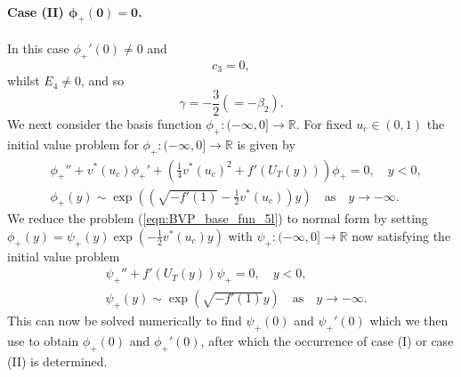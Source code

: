 \documentclass[11pt,a4paper]{article}
\newcommand{\eeref}[1]{(\ref{eqn:#1})}
\newcommand{\eelab}[1]{\label{eqn:#1}}
\def\beq{\begin{equation}}
\def\eeq{\end{equation}}
\begin{document}
\paragraph*{Case (II)   $\bm{\phi_+(0) = 0}$.}
In this case $\phi_+'(0) \neq 0$ and
\beq
c_3=0, \nonumber 
\eeq
whilst $E_4 \neq 0$, and so
\beq 
\gamma  = - \frac{3}{2} (= - \beta_2).  \nonumber
\eeq
%
We next consider the basis function $\phi_+: (- \infty,0] \to \mathbb{R}$. For fixed $u_c \in (0,1)$ the initial value problem for $\phi_+: (- \infty,0] \to \mathbb{R}$ is given by
\begin{subequations} \eelab{BVP_base_fun_5l}
 \begin{align}
& \phi_+'' + v^*(u_c) \phi_+' + \left( \frac{1}{4}v^*(u_c)^2 + f'(U_T(y)) \right) \phi_+ = 0, \quad y < 0 , \eelab{BVP_base_fun_5l_1} \\
& \phi_+(y) \sim \exp \left( \left( \sqrt{- f'(1)} - \frac{1}{2} v^*(u_c) \right) y \right) \quad \mbox{as} \quad y \to - \infty . \eelab{BVP_base_fun_5l_2}
\end{align}
\end{subequations}
We reduce the problem \eeref{BVP_base_fun_5l} to normal form by setting $\phi_+(y)=\psi_+(y) \exp{ \left( - \frac{1}{2} v^*(u_c) y \right) } $ with $\psi_+: (- \infty,0] \to \mathbb{R}$ now satisfying the initial value problem
\begin{subequations} \eelab{BVP2_base_fun_5l}
 \begin{align}
& \psi_+'' + f'(U_T(y)) \psi_+ = 0, \quad y < 0 ,   \\
& \psi_+(y) \sim \exp \left(  \sqrt{- f'(1)}  y \right) \quad \mbox{as} \quad y \to - \infty. \eelab{BVP2_base_fun_5l_2}
\end{align}
\end{subequations}
This can now be solved numerically to find $\psi_+(0)$ and $\psi_+'(0)$ which we then use to obtain $\phi_+(0)$ and $\phi_+'(0)$, after which the occurrence of case (I) or case (II) is determined.

\bigskip
\end{document}
